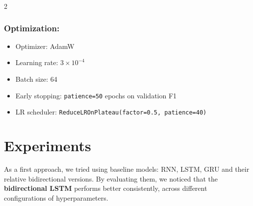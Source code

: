 \documentclass[11pt]{article}
\begin{document}
\begin{multicols}{2}
        \subsubsection{Optimization:}
        \begin{itemize}[noitemsep,topsep=0pt]
            \setlength{\itemsep}{1pt}
            \setlength{\parskip}{0pt}
            \setlength{\parsep}{0pt}
            \item Optimizer: AdamW
            \item Learning rate: $3 \times 10^{-4}$
            \item Batch size: 64
            \item Early stopping: \texttt{patience=50} epochs on validation F1
            \item LR scheduler: \texttt{ReduceLROnPlateau(factor=0.5, patience=40)}
        \end{itemize}
        
        \section{Experiments}
        As a first approach, we tried using baseline models: RNN, LSTM, GRU and their relative bidirectional versions. By evaluating them, we noticed that the \textbf{bidirectional LSTM} performs better consistently, across different configurations of hyperparameters.

        \begin{table}[H]
            \centering
        \end{table}
        


\end{multicols}
\end{document}
